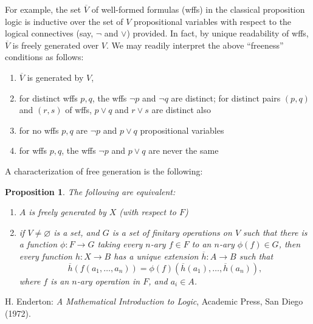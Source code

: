 \documentclass[12pt]{article}
\newtheorem{prop}{Proposition}
\begin{document}
For example, the set $\overline{V}$ of well-formed formulas (wffs) in the classical proposition logic is inductive over the set of $V$ propositional variables with respect to the logical connectives (say, $\neg$ and $\vee$) provided.  In fact, by unique readability of wffs, $\overline{V}$ is freely generated over $V$.  We may readily interpret the above ``freeness'' conditions as follows:
\begin{enumerate}
\item $\overline{V}$ is generated by $V$,
\item for distinct wffs $p,q$, the wffs $\neg p$ and $\neg q$ are distinct; for distinct pairs $(p,q)$ and $(r,s)$ of wffs, $p\vee q$ and $r\vee s$ are distinct also
\item for no wffs $p,q$ are $\neg p$ and $p\vee q$ propositional variables
\item for wffs $p,q$, the wffs $\neg p$ and $p\vee q$ are never the same
\end{enumerate}

A characterization of free generation is the following:
\begin{prop} The following are equivalent:
\begin{enumerate}
\item $A$ is freely generated by $X$ (with respect to $F$)
\item if $V\ne \varnothing$ is a set, and $G$ is a set of finitary operations on $V$ such that there is a function $\phi: F\to G$ taking every $n$-ary $f\in F$ to an $n$-ary $\phi(f)\in G$, then every function $h: X \to B$ has a unique extension $\overline{h}: A\to B$ such that $$\overline{h}(f(a_1,\ldots, a_n))=\phi(f)(\overline{h}(a_1),\ldots, \overline{h}(a_n)),$$ where $f$ is an $n$-ary operation in $F$, and $a_i\in A$.
\end{enumerate}
\end{prop}

\begin{thebibliography}{7}
 H. Enderton: {\em A Mathematical Introduction to Logic}, Academic Press, San Diego (1972).
\end{thebibliography}
\end{document}
